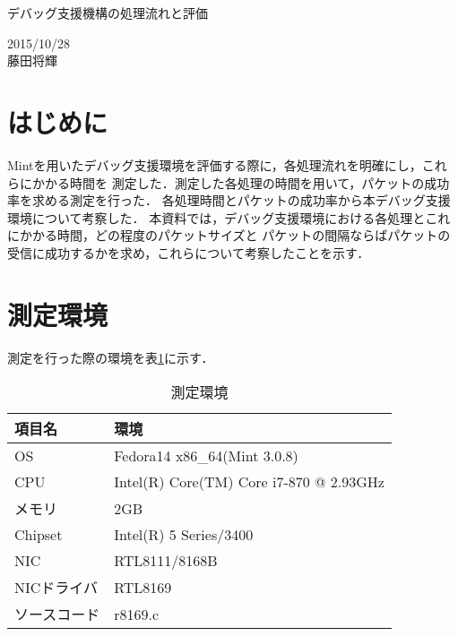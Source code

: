 \documentclass[12pt]{jsarticle}
\begin{document}

\begin{center}
    {\LARGE デバッグ支援機構の処理流れと評価}
\end{center}

\begin{flushright}
    2015/10/28\\
    藤田将輝
\end{flushright}
\section{はじめに}

Mintを用いたデバッグ支援環境を評価する際に，各処理流れを明確にし，これらにかかる時間を
測定した．測定した各処理の時間を用いて，パケットの成功率を求める測定を行った．
各処理時間とパケットの成功率から本デバッグ支援環境について考察した．
本資料では，デバッグ支援環境における各処理とこれにかかる時間，どの程度のパケットサイズと
パケットの間隔ならばパケットの受信に成功するかを求め，これらについて考察したことを示す．

\section{測定環境}

測定を行った際の環境を表\ref{environment}に示す．

\begin{table}[h]
    \caption{測定環境}
    \label{environment}
    \begin{center}
        \begin{tabular}{l|l}   \hline \hline 
            項目名      & 環境                                    \\ \hline
            OS          & Fedora14 x86\_64(Mint 3.0.8)            \\ 
            CPU         & Intel(R) Core(TM) Core i7-870 @ 2.93GHz \\
            メモリ      & 2GB                                     \\
            Chipset     & Intel(R) 5 Series/3400                  \\
            NIC         & RTL8111/8168B                           \\
            NICドライバ & RTL8169                                 \\ 
            ソースコード& r8169.c                                 \\ \hline
        \end{tabular}
    \end{center}
\end{table}
\end{document}

